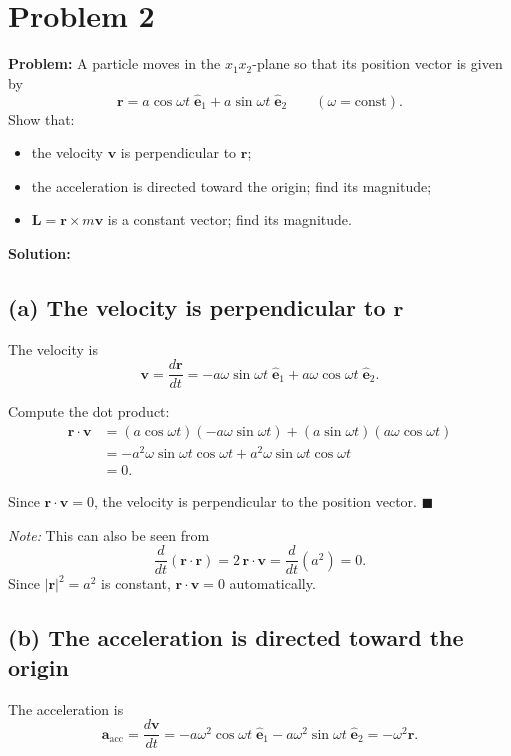 \documentclass[12pt]{article}
\newcommand{\vect}[1]{\mathbf{#1}}
\newcommand{\ehat}[1]{\hat{\vect{e}}_{#1}}
\begin{document}
\section*{Problem 2}

\textbf{Problem:} A particle moves in the $x_1 x_2$-plane so that its position vector is given by
\[
\vect{r} = a \cos \omega t \; \ehat{1} + a \sin \omega t \; \ehat{2} \qquad (\omega = \text{const}).
\]
Show that:
\begin{itemize}
\item[(a)] the velocity $\vect{v}$ is perpendicular to $\vect{r}$;
\item[(b)] the acceleration is directed toward the origin; find its magnitude;
\item[(c)] $\vect{L} = \vect{r} \times m\vect{v}$ is a constant vector; find its magnitude.
\end{itemize}

\bigskip
\textbf{Solution:}

\subsection*{(a) The velocity is perpendicular to $\vect{r}$}

The velocity is
\[
\vect{v} = \frac{d\vect{r}}{dt} = -a\omega \sin\omega t \; \ehat{1} + a\omega \cos\omega t \; \ehat{2}.
\]

Compute the dot product:
\begin{align}
\vect{r} \cdot \vect{v} &= (a\cos\omega t)(-a\omega\sin\omega t) + (a\sin\omega t)(a\omega\cos\omega t) \\
&= -a^2\omega \sin\omega t \cos\omega t + a^2\omega \sin\omega t \cos\omega t \\
&= 0.
\end{align}

Since $\vect{r} \cdot \vect{v} = 0$, the velocity is perpendicular to the position vector. \hfill $\blacksquare$

\textit{Note:} This can also be seen from
\[
\frac{d}{dt}(\vect{r} \cdot \vect{r}) = 2\,\vect{r} \cdot \vect{v} = \frac{d}{dt}(a^2) = 0.
\]
Since $|\vect{r}|^2 = a^2$ is constant, $\vect{r} \cdot \vect{v} = 0$ automatically.

\subsection*{(b) The acceleration is directed toward the origin}

The acceleration is
\[
\vect{a}_{\text{acc}} = \frac{d\vect{v}}{dt} = -a\omega^2 \cos\omega t \; \ehat{1} - a\omega^2 \sin\omega t \; \ehat{2} = -\omega^2 \vect{r}.
\]
\end{document}
